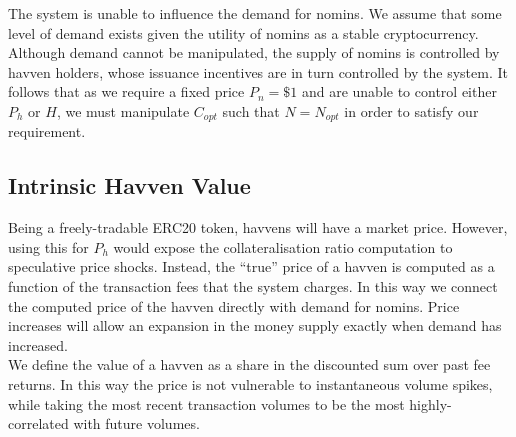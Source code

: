 \begin{center}
\end{center}

\noindent The system is unable to influence the demand for nomins. We assume that some level of demand exists given the utility of nomins as a stable cryptocurrency. Although demand cannot be manipulated, the supply of nomins is controlled by havven holders, whose issuance incentives are in turn controlled by the system. It follows that as we require a fixed price $P_n = \$1 $ and are unable to control either $P_h$ or $H$, we must manipulate $C_{opt}$ such that $N = N_{opt}$ in order to satisfy our requirement.

\subsection{Intrinsic Havven Value}

\noindent Being a freely-tradable ERC20 token, havvens will have a market price.
However, using this for $P_h$ would expose the collateralisation ratio computation
to speculative price shocks. Instead, the ``true'' price of a havven is computed as a
function of the transaction fees that the system charges. In this way we connect the
computed price of the havven directly with demand for nomins.
Price increases will allow an expansion in the money supply exactly when demand has increased. \\

\noindent We define the value of a havven as a share in the discounted sum over past fee returns.
In this way the price is not vulnerable to instantaneous volume spikes, while
taking the most recent transaction volumes to be the most highly-correlated with future volumes.

